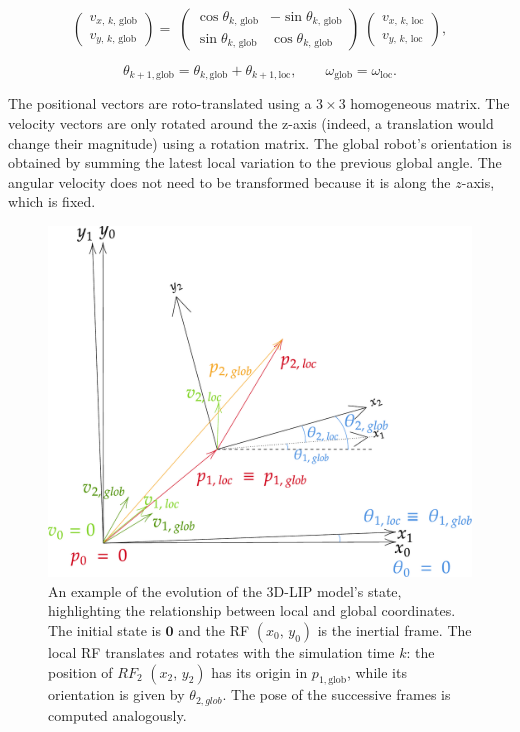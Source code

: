 \documentclass[main.tex]{subfiles}
\begin{document}
$$
\begin{pmatrix} v_{x,\,k,\,\text{glob} } \\ v_{y,\,k,\,\text{glob}}\end{pmatrix} = \; \begin{pmatrix} \cos\theta_{k,\, \text{glob}} & -\sin\theta_{k,\, \text{glob}} \\ \sin\theta_{k,\, \text{glob}} & \cos\theta_{k,\, \text{glob}} \end{pmatrix}\;
\begin{pmatrix}
v_{x,\,k,\,\text{loc} } \\ v_{y,\,k,\,\text{loc}}
\end{pmatrix},
$$

$$ 
\theta_{k+1, \text{glob}} = \theta_{k, \text{glob}} + \theta_{k+1, \text{loc}},
\qquad
\omega_{\text{glob}} = \omega_{\text{loc}}.
$$

The positional vectors are roto-translated using a $3\times3$ homogeneous matrix. The velocity vectors are only rotated around the z-axis (indeed, a translation would change their magnitude) using a rotation matrix. The global robot's orientation is obtained by summing the latest local variation to the previous global angle. The angular velocity does not need to be transformed because it is along the $z$-axis, which is fixed.

\begin{figure}[h]
    \centering
    \includegraphics[width=0.75\linewidth]{figures/LIP/loc_to_glob_tfm2.pdf}
    \caption{An example of the evolution of the 3D-LIP model's state, highlighting the relationship between local and global coordinates. The initial state is $\mathbf{0}$ and the RF $(x_0,\, y_0)$ is the inertial frame. The local RF translates and rotates with the simulation time $k$: the position of $RF_2$ $(x_2,\, y_2)$ has its origin in $p_{1, \text{glob}}$, while its orientation is given by $\theta_{2, glob}$. The pose of the successive frames is computed analogously.}
    \label{fig:loc_to_glob_tfm}
\end{figure}
\end{document}
